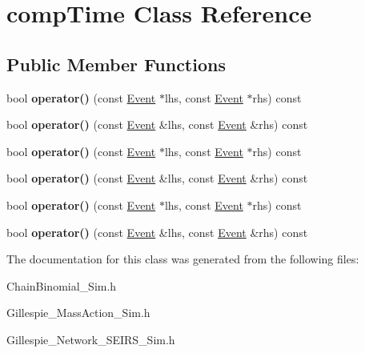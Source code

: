 \hypertarget{classcompTime}{}\section{comp\+Time Class Reference}
\label{classcompTime}
\subsection*{Public Member Functions}
\begin{DoxyCompactItemize}
\item 
\hypertarget{classcompTime_a55a31c09678c7121976d07a5b46c9ef0}{}bool {\bfseries operator()} (const \hyperlink{classEvent}{Event} $\ast$lhs, const \hyperlink{classEvent}{Event} $\ast$rhs) const \label{classcompTime_a55a31c09678c7121976d07a5b46c9ef0}

\item 
\hypertarget{classcompTime_ada86cc3bfdd095db80a56254f5ecacf2}{}bool {\bfseries operator()} (const \hyperlink{classEvent}{Event} \&lhs, const \hyperlink{classEvent}{Event} \&rhs) const \label{classcompTime_ada86cc3bfdd095db80a56254f5ecacf2}

\item 
\hypertarget{classcompTime_a55a31c09678c7121976d07a5b46c9ef0}{}bool {\bfseries operator()} (const \hyperlink{classEvent}{Event} $\ast$lhs, const \hyperlink{classEvent}{Event} $\ast$rhs) const \label{classcompTime_a55a31c09678c7121976d07a5b46c9ef0}

\item 
\hypertarget{classcompTime_ada86cc3bfdd095db80a56254f5ecacf2}{}bool {\bfseries operator()} (const \hyperlink{classEvent}{Event} \&lhs, const \hyperlink{classEvent}{Event} \&rhs) const \label{classcompTime_ada86cc3bfdd095db80a56254f5ecacf2}

\item 
\hypertarget{classcompTime_a55a31c09678c7121976d07a5b46c9ef0}{}bool {\bfseries operator()} (const \hyperlink{classEvent}{Event} $\ast$lhs, const \hyperlink{classEvent}{Event} $\ast$rhs) const \label{classcompTime_a55a31c09678c7121976d07a5b46c9ef0}

\item 
\hypertarget{classcompTime_ada86cc3bfdd095db80a56254f5ecacf2}{}bool {\bfseries operator()} (const \hyperlink{classEvent}{Event} \&lhs, const \hyperlink{classEvent}{Event} \&rhs) const \label{classcompTime_ada86cc3bfdd095db80a56254f5ecacf2}

\end{DoxyCompactItemize}


The documentation for this class was generated from the following files\+:\begin{DoxyCompactItemize}
\item 
Chain\+Binomial\+\_\+\+Sim.\+h\item 
Gillespie\+\_\+\+Mass\+Action\+\_\+\+Sim.\+h\item 
Gillespie\+\_\+\+Network\+\_\+\+S\+E\+I\+R\+S\+\_\+\+Sim.\+h\end{DoxyCompactItemize}
